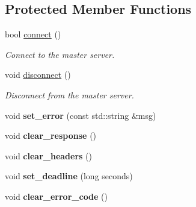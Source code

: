 \subsection*{Protected Member Functions}
\begin{DoxyCompactItemize}
\item 
\mbox{\label{class_vessel_1_1_networking_1_1_http_client_a9cd9e9802dbaa9f8c2c63cb5e93b5262}} 
bool \hyperlink{class_vessel_1_1_networking_1_1_http_client_a9cd9e9802dbaa9f8c2c63cb5e93b5262}{connect} ()
\begin{DoxyCompactList}\small\item\em Connect to the master server. \end{DoxyCompactList}\item 
\mbox{\label{class_vessel_1_1_networking_1_1_http_client_aef341ffac0b8a90420255f22edf38766}} 
void \hyperlink{class_vessel_1_1_networking_1_1_http_client_aef341ffac0b8a90420255f22edf38766}{disconnect} ()
\begin{DoxyCompactList}\small\item\em Disconnect from the master server. \end{DoxyCompactList}\item 
\mbox{\label{class_vessel_1_1_networking_1_1_http_client_add0d106ed5f671a9e1c60fcb439c0add}} 
void {\bfseries set\+\_\+error} (const std\+::string \&msg)
\item 
\mbox{\label{class_vessel_1_1_networking_1_1_http_client_a4144a8d41fe448b00d0303714dddda43}} 
void {\bfseries clear\+\_\+response} ()
\item 
\mbox{\label{class_vessel_1_1_networking_1_1_http_client_a74d8a93a37464787afb8a5a30419b5f6}} 
void {\bfseries clear\+\_\+headers} ()
\item 
\mbox{\label{class_vessel_1_1_networking_1_1_http_client_a7d8918a5ff92aaa011ff9d2228a2b5da}} 
void {\bfseries set\+\_\+deadline} (long seconds)
\item 
\mbox{\label{class_vessel_1_1_networking_1_1_http_client_ac880ff449e873473e041b0b7fd6e0881}} 
void {\bfseries clear\+\_\+error\+\_\+code} ()
\end{DoxyCompactItemize}


